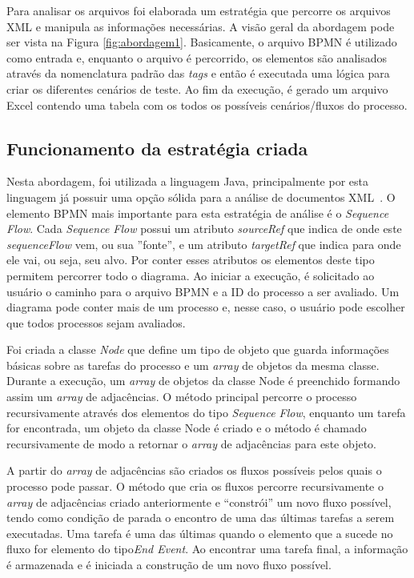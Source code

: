 \documentclass[12pt]{article}
\begin{document}
Para analisar os arquivos foi elaborada um estratégia que percorre os arquivos XML e manipula as informações necessárias. A visão geral da abordagem pode ser vista na Figura \ref{fig:abordagem1}. Basicamente, o arquivo BPMN é utilizado como entrada e, enquanto o arquivo é percorrido, os elementos são analisados através da nomenclatura padrão das \emph{tags} e então é executada uma lógica para criar os diferentes cenários de teste. Ao fim da execução, é gerado um arquivo Excel contendo uma tabela com os todos os possíveis cenários/fluxos do processo.


\subsection{Funcionamento da estratégia criada}

Nesta abordagem, foi utilizada a linguagem Java, principalmente por esta linguagem já possuir uma opção sólida para a análise de documentos XML~\cite{javadom}. O elemento BPMN mais importante para esta estratégia de análise é o \emph{Sequence Flow}. Cada \emph{Sequence Flow} possui um atributo \emph{sourceRef} que indica de onde este \emph{sequenceFlow} vem, ou sua ''fonte'', e um atributo \emph{targetRef} que indica para onde ele vai, ou seja, seu alvo. Por conter esses atributos os elementos deste tipo permitem percorrer todo o diagrama. Ao iniciar a execução, é solicitado ao usuário o caminho para o arquivo BPMN e a ID do processo a ser avaliado. Um diagrama pode conter mais de um processo e, nesse caso, o usuário pode escolher que todos processos sejam avaliados.

Foi criada a classe \emph{Node} que define um tipo de objeto que guarda informações básicas sobre as tarefas do processo e um \emph{array} de objetos da mesma classe. Durante a execução, um \emph{array} de objetos da classe Node é preenchido formando assim um \emph{array} de adjacências. O método principal percorre o processo recursivamente através dos elementos do tipo \emph{Sequence Flow}, enquanto um tarefa for encontrada, um objeto da classe Node é criado e o método é chamado recursivamente de modo a retornar o \emph{array} de adjacências para este objeto.

A partir do \emph{array} de adjacências são criados os fluxos possíveis pelos quais o processo pode passar. O método que cria os fluxos percorre recursivamente o \emph{array} de adjacências criado anteriormente e ``constrói'' um novo fluxo possível, tendo como condição de parada o encontro de uma das últimas tarefas a serem executadas. Uma tarefa é uma das últimas quando o elemento que a sucede no fluxo for elemento do tipo\emph{End Event}. Ao encontrar uma tarefa final, a informação é armazenada e é iniciada a construção de um novo fluxo possível.
\end{document}
